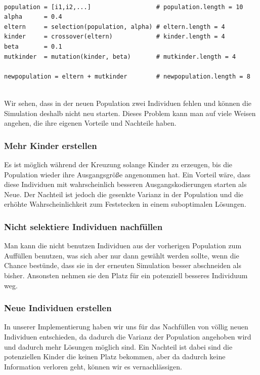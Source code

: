             \begin{mdframed}
            \begin{verbatim}

population = [i1,i2,...]                  # population.length = 10
alpha      = 0.4
eltern     = selection(population, alpha) # eltern.length = 4
kinder     = crossover(eltern)            # kinder.length = 4
beta       = 0.1
mutkinder  = mutation(kinder, beta)       # mutkinder.length = 4

newpopulation = eltern + mutkinder        # newpopulation.length = 8
            \end{verbatim}
            \end{mdframed}
            \hfill \\
            \noindent
            Wir sehen, dass in der neuen Population zwei Individuen fehlen und können die Simulation deshalb nicht neu starten. Dieses Problem kann man auf viele Weisen angehen, die ihre eigenen Vorteile und Nachteile haben. 

            \subsubsection*{Mehr Kinder erstellen}
                Es ist möglich während der Kreuzung solange Kinder zu erzeugen, bis die Population wieder ihre Ausgangsgröße angenommen hat. Ein Vorteil wäre, dass diese Individuen mit wahrscheinlich besseren Ausgangskodierungen starten als Neue. Der Nachteil ist jedoch die gesenkte Varianz in der Population und die erhöhte Wahrscheinlichkeit zum Feststecken in einem suboptimalen Lösungen.

            \subsubsection*{Nicht selektiere Individuen nachfüllen}
                Man kann die nicht benutzen Individuen aus der vorherigen Population zum Auffüllen benutzen, was sich aber nur dann gewählt werden sollte, wenn die Chance bestünde, dass sie in der erneuten Simulation besser abschneiden als bisher. Ansonsten nehmen sie den Platz für ein potenziell besseres Individuum weg.

            \subsubsection*{Neue Individuen erstellen}
                In unserer Implementierung haben wir uns für das Nachfüllen von völlig neuen Individuen entschieden, da dadurch die Varianz der Population angehoben wird und dadurch mehr Lösungen möglich sind. Ein Nachteil ist dabei sind die potenziellen Kinder die  keinen Platz bekommen, aber da dadurch keine Information verloren geht, können wir es vernachlässigen.
\newpage

